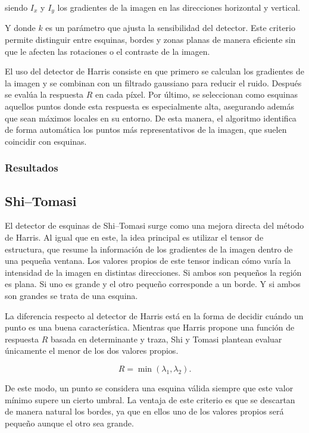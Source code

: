 siendo \(I_x\) y \(I_y\) los gradientes de la imagen en las direcciones horizontal y vertical.

Y donde \(k\) es un parámetro que ajusta la sensibilidad del detector. Este criterio permite distinguir entre esquinas, bordes y zonas planas de manera eficiente sin que le afecten las rotaciones o el contraste de la imagen.

El uso del detector de Harris consiste en que primero se calculan los gradientes de la imagen y se combinan con un filtrado gaussiano para reducir el ruido. Después se evalúa la respuesta \(R\) en cada píxel. Por último, se seleccionan como esquinas aquellos puntos donde esta respuesta es especialmente alta, asegurando además que sean máximos locales en su entorno. De esta manera, el algoritmo identifica de forma automática los puntos más representativos de la imagen, que suelen coincidir con esquinas.


\subsubsection{Resultados}


\subsection{Shi–Tomasi}

El detector de esquinas de Shi--Tomasi \cite{shi1994good} surge como una mejora directa del método de Harris. Al igual que en este, la idea principal es utilizar el tensor de estructura, que resume la información de los gradientes de la imagen dentro de una pequeña ventana. Los valores propios de este tensor indican cómo varía la intensidad de la imagen en distintas direcciones. Si ambos son pequeños la región es plana. Si uno es grande y el otro pequeño corresponde a un borde. Y si ambos son grandes se trata de una esquina.

La diferencia respecto al detector de Harris está en la forma de decidir cuándo un punto es una buena característica. Mientras que Harris propone una función de respuesta \(R\) basada en determinante y traza, Shi y Tomasi plantean evaluar únicamente el menor de los dos valores propios.

\[
R = \min(\lambda_1, \lambda_2).
\]

De este modo, un punto se considera una esquina válida siempre que este valor mínimo supere un cierto umbral. La ventaja de este criterio es que se descartan de manera natural los bordes, ya que en ellos uno de los valores propios será pequeño aunque el otro sea grande.

